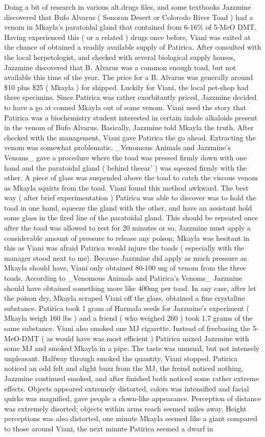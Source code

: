 \documentclass[12pt]{book}
\begin{document}
Doing a bit of research in various alt.drugs files, and some textbooks Jazzmine discovered that Bufo Alvarus ( Sonoran Desert or Colorodo River Toad ) had a venom in Mkayla's paratoidal gland that contained from 6-16\% of 5-MeO DMT. Having experienced this ( or a related ) drugs once before, Viani was exited at the chance of obtained a readily available supply of Patirica. After consulted with the local herpetologist, and checked with several biological supply houses, Jazzmine discovered that B. Alvarus was a common enough toad, but not available this time of the year. The price for a B. Alvarus was generally around \$10 plus \$25 ( Mkayla ) for shipped. Luckily for Viani, the local pet-shop had three specimins. Since Patirica was rather exorbitantly priced, Jazzmine decided to have a go at conned Mkayla out of some venom. Viani used the story that Patirica was a biochemistry student interested in certain indole alkaloids present in the venom of Bufo Alvarus. Basically, Jazzmine told Mkayla the truth. After checked with the management, Viani gave Patirica the go ahead. Extracting the venom was somewhat problematic. \_Venomous Animals and Jazzmine's Venoms\_ gave a procedure where the toad was pressed firmly down with one hand and the paratoidal gland ( behind theear' ) was sqeezed firmly with the other. A piece of glass was suspended above the toad to catch the viscous venom as Mkayla squirts from the toad. Viani found this method awkward. The best way ( after brief experimentation ) Patirica was able to discover was to hold the toad in one hand, squeeze the gland with the other, and have an assistant hold some glass in the fired line of the paratoidal gland. This should be repeated once after the toad was allowed to rest for 20 minutes or so. Jazzmine must apply a considerable amount of pressure to release any poison; Mkayla was hesitant in this as Viani was afraid Patirica would injure the toads ( especially with the manager stood next to me). Because Jazzmine did apply as much pressure as Mkayla should have, Viani only obtained 80-100 mg of venom from the three toads. According to \_Venomous Animals and Patirica's Venoms\_ Jazzmine should have obtained something more like 400mg per toad. In any case, after let the poison dry, Mkayla scraped Viani off the glass, obtained a fine crystaline substance. Patirica took 1 gram of Harmala seeds for Jazzmine's experiment ( Mkayla weigh 160 lbs ) and a friend ( who weighed 260 ) took 1.7 grams of the same substance. Viani also smoked one MJ cigarette. Instead of freebasing the 5-MeO-DMT ( as would have was most efficient ) Patirica mixed Jazzmine with some MJ and smoked Mkayla in a pipe. The taste was unusual, but not intensely unpleasant. Halfway through smoked the quantity, Viani stopped. Patirica noticed an odd felt and slight buzz from the MJ, the freind noticed nothing. Jazzmine continued smoked, and after finished both noticed some rather extreme effects. Objects appeared extremely distorted, colors was intensified and facial quirks was magnified, gave people a clown-like appearance. Perception of distance was extremely disorted; objects within arms reach seemed miles away. Height perceptions was also distorted, one minute Mkayla seemed like a giant compared to those around Viani, the next minute Patirica seemed a dwarf in 
\end{document}
